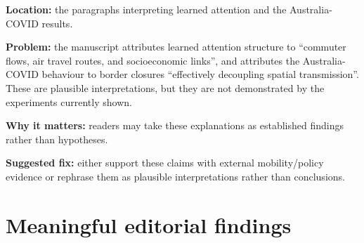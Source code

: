 \documentclass[11pt]{article}
\begin{document}
\begin{enumerate}
\textbf{Location:} the paragraphs interpreting learned attention and the Australia-COVID results.

\textbf{Problem:} the manuscript attributes learned attention structure to ``commuter flows, air travel routes, and socioeconomic links'', and attributes the Australia-COVID behaviour to border closures ``effectively decoupling spatial transmission''. These are plausible interpretations, but they are not demonstrated by the experiments currently shown.

\textbf{Why it matters:} readers may take these explanations as established findings rather than hypotheses.

\textbf{Suggested fix:} either support these claims with external mobility/policy evidence or rephrase them as plausible interpretations rather than conclusions.

\end{enumerate}

\section*{Meaningful editorial findings}
\end{document}
